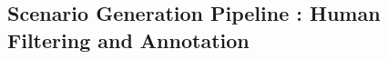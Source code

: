 \documentclass[sigconf, screen, nonacm]{acmart}
\begin{document}
\subsection{Scenario Generation Pipeline : Human Filtering and Annotation}

\end{document}

